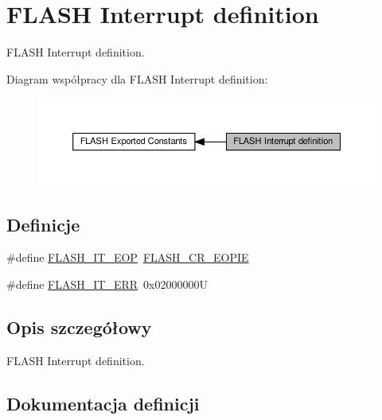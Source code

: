 \hypertarget{group___f_l_a_s_h___interrupt__definition}{}\section{F\+L\+A\+SH Interrupt definition}
\label{group___f_l_a_s_h___interrupt__definition}


F\+L\+A\+SH Interrupt definition.  


Diagram współpracy dla F\+L\+A\+SH Interrupt definition\+:\nopagebreak
\begin{figure}[H]
\begin{center}
\leavevmode
\includegraphics[width=350pt]{group___f_l_a_s_h___interrupt__definition}
\end{center}
\end{figure}
\subsection*{Definicje}
\begin{DoxyCompactItemize}
\item 
\#define \hyperlink{group___f_l_a_s_h___interrupt__definition_gaea20e80e1806d58a7544cfe8659e7f11}{F\+L\+A\+S\+H\+\_\+\+I\+T\+\_\+\+E\+OP}~\hyperlink{group___peripheral___registers___bits___definition_gab9e69856f654ec430a42791a34799db0}{F\+L\+A\+S\+H\+\_\+\+C\+R\+\_\+\+E\+O\+P\+IE}
\item 
\#define \hyperlink{group___f_l_a_s_h___interrupt__definition_ga4e2c23ab8c1b9a5ee49bf6d695d9ae8c}{F\+L\+A\+S\+H\+\_\+\+I\+T\+\_\+\+E\+RR}~0x02000000U
\end{DoxyCompactItemize}


\subsection{Opis szczegółowy}
F\+L\+A\+SH Interrupt definition. 



\subsection{Dokumentacja definicji}
\mbox{\label{group___f_l_a_s_h___interrupt__definition_gaea20e80e1806d58a7544cfe8659e7f11}} 
